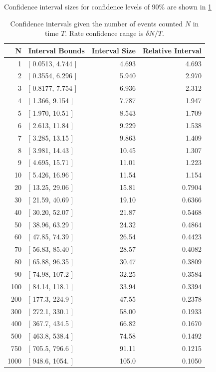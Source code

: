 \documentclass{article}
\begin{document}
Confidence interval sizes for confidence levels of 90\% are shown in \ref{tab:conf}

\begin{table}
    \begin{tabular}{r|l|r|r}
     \hline
N & Interval Bounds & Interval Size & Relative Interval\\ 
\hline 
1 &  [ 0.0513, 4.744 ] & 4.693 & 4.693\\ 
2 &  [ 0.3554, 6.296 ] & 5.940 & 2.970\\ 
3 &  [ 0.8177, 7.754 ] & 6.936 & 2.312\\ 
4 &  [ 1.366, 9.154 ] & 7.787 & 1.947\\ 
5 &  [ 1.970, 10.51 ] & 8.543 & 1.709\\ 
6 &  [ 2.613, 11.84 ] & 9.229 & 1.538\\ 
7 &  [ 3.285, 13.15 ] & 9.863 & 1.409\\ 
8 &  [ 3.981, 14.43 ] & 10.45 & 1.307\\ 
9 &  [ 4.695, 15.71 ] & 11.01 & 1.223\\ 
10 &  [ 5.426, 16.96 ] & 11.54 & 1.154\\ 
20 &  [ 13.25, 29.06 ] & 15.81 & 0.7904\\ 
30 & [ 21.59, 40.69 ] & 19.10 & 0.6366\\ 
40 & [ 30.20, 52.07 ] & 21.87 & 0.5468\\ 
50 & [ 38.96, 63.29 ] & 24.32 & 0.4864\\ 
60 & [ 47.85, 74.39 ] & 26.54 & 0.4423\\ 
70 & [ 56.83, 85.40 ] & 28.57 & 0.4082\\ 
80 & [ 65.88, 96.35 ] & 30.47 & 0.3809\\ 
90 & [ 74.98, 107.2 ] & 32.25 & 0.3584\\ 
100 & [ 84.14, 118.1 ] & 33.94 & 0.3394\\ 
200 & [ 177.3, 224.9 ] & 47.55 & 0.2378\\ 
300 & [ 272.1, 330.1 ] & 58.00 & 0.1933\\ 
400 & [ 367.7, 434.5 ] & 66.82 & 0.1670\\ 
500 & [ 463.8, 538.4 ] & 74.58 & 0.1492\\ 
750 & [ 705.5, 796.6 ] & 91.11 & 0.1215\\ 
1000 & [ 948.6,  1054. ] & 105.0 & 0.1050\\ 
\end{tabular}
\caption{Confidence intervals given the number of events counted $N$ in time $T$.  Rate confidence range is $\delta N/T$.}
\label{tab:conf}
\end{table}
\end{document}
